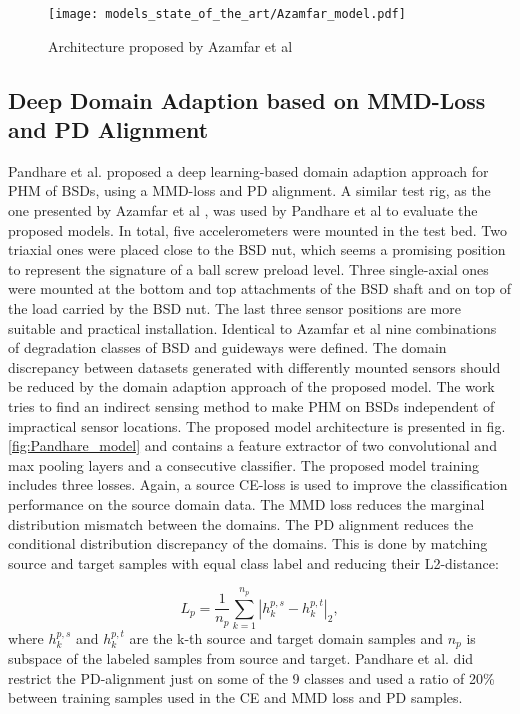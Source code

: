 \begin{figure}[H]
  \centering
  \texttt{[image: models\_state\_of\_the\_art/Azamfar\_model.pdf]}
  \caption{Architecture proposed by Azamfar et al \cite{AZAMFAR2020103932}}
  \label{fig:Azamfar_model}
\end{figure}


\subsection{Deep Domain Adaption based on MMD-Loss and PD Alignment}
Pandhare et al. \cite{Pandhare2021} proposed a deep learning-based domain adaption approach for PHM of BSDs, using a MMD-loss and PD alignment. A similar test rig, as the one presented by Azamfar et al \cite{AZAMFAR2020103932}, was used by Pandhare et al to evaluate the proposed models. In total, five accelerometers were mounted in the test bed. Two triaxial ones were placed close to the BSD nut, which seems a promising position to represent the signature of a ball screw preload level. Three single-axial ones were mounted at the bottom and top attachments of the BSD shaft and on top of the load carried by the BSD nut. The last three sensor positions are more suitable and practical installation. Identical to Azamfar et al \cite{AZAMFAR2020103932} nine combinations of degradation classes of BSD and guideways were defined. The domain discrepancy between datasets generated with differently mounted sensors should be reduced by the domain adaption approach of the proposed model. The work tries to find an indirect sensing method to make PHM on BSDs independent of impractical sensor locations. The proposed model architecture is presented in fig. \ref{fig:Pandhare_model} and contains a feature extractor of two convolutional and max pooling layers and a consecutive classifier. The proposed model training includes three losses. Again, a source CE-loss is used to improve the classification performance on the source domain data. The MMD loss reduces the marginal distribution mismatch between the domains. The PD alignment reduces the conditional distribution discrepancy of the domains. This is done by matching source and target samples with equal class label and reducing their L2-distance: 

\begin{equation}
    L_{p} = \frac{1}{n_{p}}\sum_{k=1}^{n_{p}}|h_{k}^{p,s}-h_{k}^{p,t}|_{2}, 
\end{equation}
where $h_{k}^{p,s}$ and $h_{k}^{p,t}$ are the k-th source and target domain samples and $n_{p}$ is subspace of the labeled samples from source and target. Pandhare et al. did restrict the PD-alignment just on some of the 9 classes and used a ratio of 20\% between training samples used in the CE and MMD loss and PD samples. 

